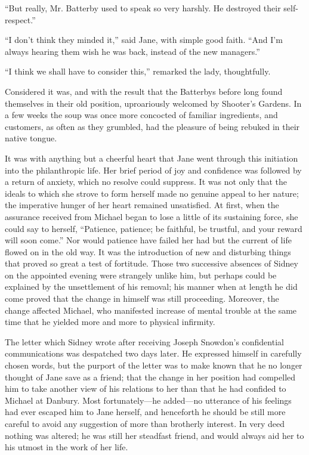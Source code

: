 ``But really, Mr. Batterby used to speak so very harshly. He destroyed
their self-respect.''

``I don't think they minded it,'' said Jane, with simple good faith.
``And I'm always hearing them wish he was back, instead of the new
managers.''

``I think we shall have to consider this,'' remarked the lady,
thoughtfully.

Considered it was, and with the result that the Batterbys before long
found themselves in their old position, uproariously welcomed by
Shooter's Gardens. In a few weeks the soup was once more concocted of
familiar ingredients, and customers, as often as they grumbled, had the
pleasure of being rebuked in their native tongue.

It was with anything but a cheerful heart that Jane went through this
initiation into the philanthropic life. Her brief period of joy and
confidence was followed by a return of anxiety, which no resolve could
suppress. It was not only that the ideals to which she strove to form
herself made no genuine appeal {\protect\hypertarget{15}{}{}}to her
nature; the imperative hunger of her heart remained unsatisfied. At
first, when the assurance received from Michael began to lose a little
of its sustaining force, she could say to herself, ``Patience, patience;
be faithful, be trustful, and your reward will soon come.'' Nor would
patience have failed her had but the current of life flowed on in the
old way. It was the introduction of new and disturbing things that
proved so great a test of fortitude. Those two successive absences of
Sidney on the appointed evening were strangely unlike him, but perhaps
could be explained by the unsettlement of his removal; his manner when
at length he did come proved that the change in himself was still
proceeding. Moreover, the change affected Michael, who manifested
increase of mental trouble at the same time that he yielded more and
more to physical infirmity.

The letter which Sidney wrote after receiving Joseph Snowdon's
confidential communications was despatched two days later. He expressed
himself in carefully chosen words, but the purport of the letter was to
make known that he no longer thought of Jane save
{\protect\hypertarget{16}{}{}}as a friend; that the change in her
position had compelled him to take another view of his relations to her
than that he had confided to Michael at Danbury. Most fortunately---he
added---no utterance of his feelings had ever escaped him to Jane
herself, and henceforth he should be still more careful to avoid any
suggestion of more than brotherly interest. In very deed nothing was
altered; he was still her steadfast friend, and would always aid her to
his utmost in the work of her life.

